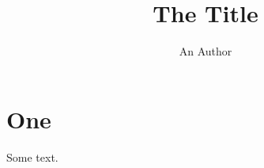 \documentclass[titlepage,openany]{book}
\title{The Title}\author{An Author}
\begin{document}
\frontmatter
\maketitle
\tableofcontents
\mainmatter
\chapter{One}
Some text.
\end{document}
